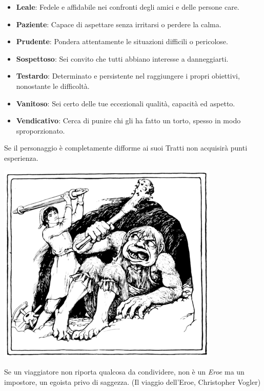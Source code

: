 \begin{multicols}{2}
\begin{itemize}[leftmargin=*]
	\item \textbf{Leale}: Fedele e affidabile nei confronti degli amici e delle persone care.
	\item \textbf{Paziente}: Capace di aspettare senza irritarsi o perdere la calma.
	\item \textbf{Prudente}: Pondera attentamente le situazioni difficili o pericolose.
	\item \textbf{Sospettoso}: Sei convito che tutti abbiano interesse a danneggiarti.
	\item \textbf{Testardo}: Determinato e persistente nel raggiungere i propri obiettivi, nonostante le difficoltà.
	\item \textbf{Vanitoso}: Sei certo delle tue eccezionali qualità, capacità ed aspetto.
	\item \textbf{Vendicativo}: Cerca di punire chi gli ha fatto un torto, spesso in modo sproporzionato.
	
\end{itemize}

\end{multicols}


\smallskip

Se il personaggio è completamente difforme ai suoi Tratti non acquisirà punti esperienza.

\vfill

\begin{center}
\includegraphics[height=0.4\linewidth]{immagini/troll.png}
\end{center}

\medskip

\begin{changemargin}{0.3cm}{0.3cm}\begin{enfasi}{Se un viaggiatore non riporta qualcosa da condividere, non è un \emph{Eroe} ma un impostore, un egoista privo di saggezza. (Il viaggio dell'Eroe, Christopher Vogler)}\end{enfasi}\end{changemargin}

\pagebreak

